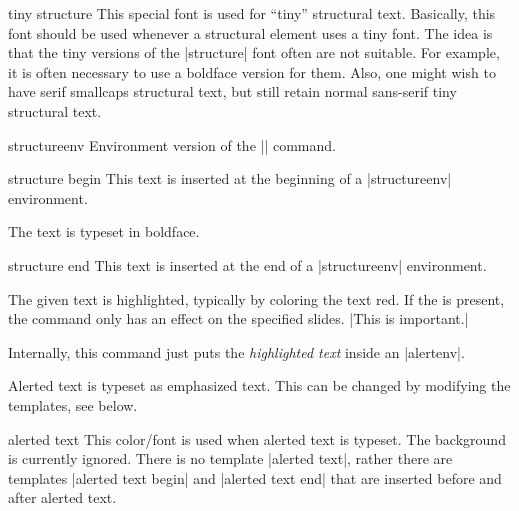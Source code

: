 \begin{command}{\structure{}}
  \begin{element}{tiny structure}\no\no\yes
    This special font is used for ``tiny'' structural text. Basically, this font should be used whenever a structural element uses a tiny font. The idea is that the tiny versions of the |structure| font often are not suitable. For example, it is often necessary to use a boldface version for them. Also, one might wish to have serif smallcaps structural text, but still retain normal sans-serif tiny structural text.
  \end{element}
\end{command}

\begin{environment}{{structureenv}}
  Environment version of the |\structure| command.

  \begin{element}{structure begin}\yes\no\no
    This text is inserted at the beginning of a |structureenv| environment.

    \begin{templateoptions}

      \articlenote
      The text is typeset in boldface.
    \end{templateoptions}
  \end{element}

  \begin{element}{structure end}\yes\no\no
    This text is inserted at the end of a |structureenv| environment.
  \end{element}
\end{environment}


\begin{command}{\alert{}}
  The given text is highlighted, typically by coloring the text red. If the  is present, the command only has an effect on the specified slides.
  \example
  |This is \alert{important}.|

  Internally, this command just puts the \emph{highlighted text} inside an |alertenv|.

  \articlenote
  Alerted text is typeset as emphasized text. This can be changed by modifying the templates, see below.

  \begin{element}{alerted text}\no\yes\yes
    This color/font is used when alerted text is typeset. The background is currently ignored. There is no template |alerted text|, rather there are templates |alerted text begin| and |alerted text end| that are inserted before and after alerted text.
  \end{element}
\end{command}

